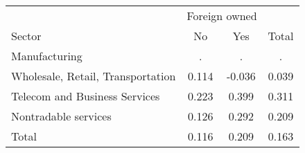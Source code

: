 \begin{tabular}{l*{3}{c}}
\toprule
 & \multicolumn{2}{c}{Foreign owned} & \\
\cmidrule(lr){2-3}
Sector & No & Yes & Total \\
\midrule
Manufacturing & . & . & . \\
Wholesale, Retail, Transportation & 0.114 & -0.036 & 0.039 \\
Telecom and Business Services & 0.223 & 0.399 & 0.311 \\
Nontradable services & 0.126 & 0.292 & 0.209 \\
\midrule
Total & 0.116 & 0.209 & 0.163 \\
\bottomrule
\end{tabular}

